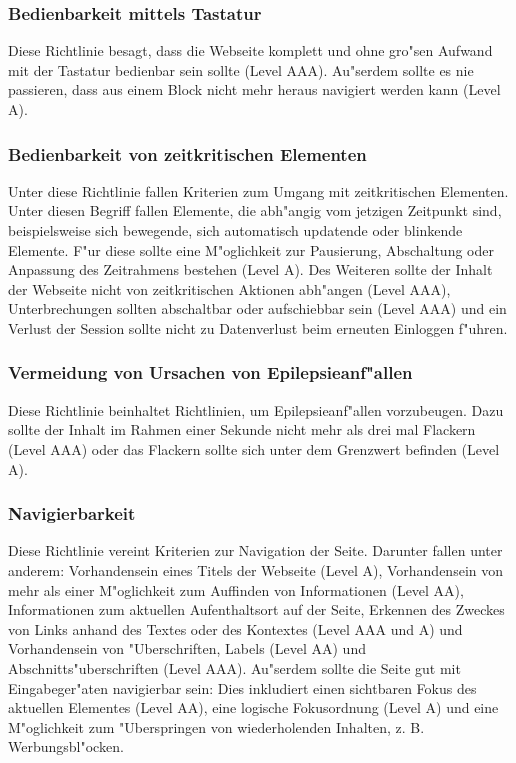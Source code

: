 \documentclass[a4paper,bibtotoc,oneside]{scrbook}
\begin{document}
\subsubsection{Bedienbarkeit mittels Tastatur}
Diese Richtlinie besagt, dass die Webseite komplett und ohne gro"sen Aufwand mit der Tastatur bedienbar sein sollte (Level AAA). Au"serdem sollte es nie passieren, dass aus einem Block nicht mehr heraus navigiert werden kann (Level A). \cite[Abschnitt 2.1]{wcag2}

\subsubsection{Bedienbarkeit von zeitkritischen Elementen}
Unter diese Richtlinie fallen Kriterien zum Umgang mit zeitkritischen Elementen. Unter diesen Begriff fallen Elemente, die abh"angig vom jetzigen Zeitpunkt sind, beispielsweise sich bewegende, sich automatisch updatende oder blinkende Elemente. F"ur diese sollte eine M"oglichkeit zur Pausierung, Abschaltung oder Anpassung des Zeitrahmens bestehen (Level A). Des Weiteren sollte der Inhalt der Webseite nicht von zeitkritischen Aktionen abh"angen (Level AAA), Unterbrechungen sollten abschaltbar oder aufschiebbar sein (Level AAA) und ein Verlust der Session sollte nicht zu Datenverlust beim erneuten Einloggen f"uhren. \cite[Abschnitt 2.2]{wcag2}

\subsubsection{Vermeidung von Ursachen von Epilepsieanf"allen}
Diese Richtlinie beinhaltet Richtlinien, um Epilepsieanf"allen vorzubeugen. Dazu sollte der Inhalt im Rahmen einer Sekunde nicht mehr als drei mal Flackern (Level AAA) oder das Flackern sollte sich unter dem Grenzwert befinden (Level A). \cite[Abschnitt 2.3]{wcag2}

\subsubsection{Navigierbarkeit}
Diese Richtlinie vereint Kriterien zur Navigation der Seite. Darunter fallen unter anderem: Vorhandensein eines Titels der Webseite (Level A), Vorhandensein von mehr als einer M"oglichkeit zum Auffinden von Informationen (Level AA), Informationen zum aktuellen Aufenthaltsort auf der Seite, Erkennen des Zweckes von Links anhand des Textes oder des Kontextes (Level AAA und A) und Vorhandensein von "Uberschriften, Labels (Level AA) und Abschnitts"uberschriften (Level AAA). Au"serdem sollte die Seite gut mit Eingabeger"aten navigierbar sein: Dies inkludiert einen sichtbaren Fokus des aktuellen Elementes (Level AA), eine logische Fokusordnung (Level A) und eine M"oglichkeit zum "Uberspringen von wiederholenden Inhalten, z. B. Werbungsbl"ocken. \cite[Abschnitt 2.4]{wcag2}
\end{document}
